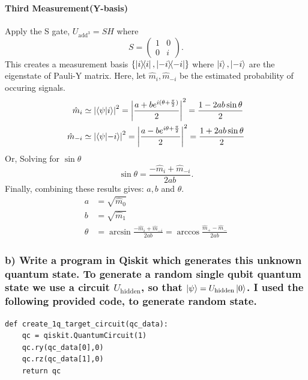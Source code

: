 \documentclass[a4paper, 11pt]{article}
\begin{document}
\paragraph{Third Measurement(Y-basis)}
Apply the S gate, $U_{\text{add}^{3}} = S H$ where
\begin{equation}
  S = \begin{pmatrix}
    1 & 0 \\
    0 & i 
  \end{pmatrix}.
\end{equation}
This creates a measurement basis $\left\{ \ketbra{i}, \ketbra{-i}\right\}$ where $\ket{i}, \ket{-i}$ are the eigenstate of Pauli-Y matrix.
Here, let $\hat{m}_{i}, \hat{m}_{-i}$ be the estimated probability of occuring signals.
\begin{align}
  \hat{m}_{i} &\simeq  \left| \bra{\psi}\ket{i} \right|^2 = \left| \frac{a + b e^{i(\theta + \frac{\pi}{2})}}{2} \right|^2 = \frac{1 - 2ab\sin\theta}{2}  \\
  \hat{m}_{-i} &\simeq  \left| \bra{\psi}\ket{-i} \right|^2 = \left| \frac{a - b e^{i\theta  + \frac{\pi}{2}}}{2} \right|^2 = \frac{1 + 2ab\sin\theta}{2}  
\end{align}
Or, Solving for $\sin\theta$
\begin{equation}
  \sin\theta =  \frac{-\hat{m}_{i} + \hat{m}_{-i}}{2ab}.
\end{equation}
Finally, combining these results gives: $a, b$ and $\theta$. 
\begin{align}
  a &= \sqrt{\hat{m}_0} \\
  b &= \sqrt{\hat{m}_1} \\
  \theta &= \arcsin\frac{-\hat{m}_{i} + \hat{m}_{-i}}{2ab} = \arccos \frac{\hat{m}_{+} - \hat{m}_{-}}{2ab}
\end{align}

\subsubsection*{b) Write a program in Qiskit which generates this unknown quantum state.
To generate a random single qubit quantum state we use a circuit $U_{\text{hidden}}$, so that $\ket{\psi} = U_{\text{hidden}} \ket{0}$.
I used the following provided code, to generate random state. }
\begin{verbatim}
def create_1q_target_circuit(qc_data):
    qc = qiskit.QuantumCircuit(1)
    qc.ry(qc_data[0],0)
    qc.rz(qc_data[1],0)
    return qc
\end{verbatim}
\end{document}
